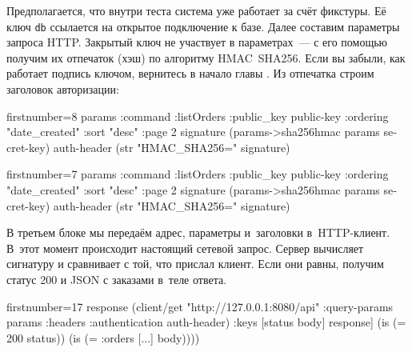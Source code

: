 \fi

\wavebottom

Предполагается, что внутри теста система уже работает за счёт фикстуры. Её ключ
\verb|db| ссылается на открытое подключение к базе. Далее составим параметры
запроса HTTP. Закрытый ключ не участвует в параметрах~--- с его помощью получим
их отпечаток (хэш) по алгоритму HMAC~SHA256. Если вы забыли, как работает
подпись ключом, вернитесь в начало главы . Из отпечатка строим
заголовок авторизации:

\wavetop

\ifx\devicetype\mobile

\begin{english}
  \begin{clojure/lines*}{firstnumber=8}
    params {:command :listOrders
            :public_key public-key
            :ordering "date_created"
            :sort "desc"
            :page 2}
    signature (params->sha256hmac
                params secret-key)
    auth-header (str "HMAC_SHA256="
                  signature)
  \end{clojure/lines*}
\end{english}

\else

\begin{english}
  \begin{clojure/lines*}{firstnumber=7}
        params {:command :listOrders
                :public_key public-key
                :ordering "date_created"
                :sort "desc"
                :page 2}
        signature (params->sha256hmac params secret-key)
        auth-header (str "HMAC_SHA256=" signature)
  \end{clojure/lines*}
\end{english}

\fi

\wavebottom

В третьем блоке мы передаём адрес, параметры и~заголовки в~HTTP-клиент. В~этот
момент происходит настоящий сетевой запрос. Сервер вычисляет сигнатуру и
сравнивает с той, что прислал клиент. Если они равны, получим статус 200 и JSON
с заказами в~теле ответа.

\wavetop

\ifx\devicetype\mobile

\begin{english}
  \begin{clojure/lines*}{firstnumber=17}
    response
    (client/get
      "http://127.0.0.1:8080/api"
      {:query-params params
       :headers {:authentication
                 auth-header}})
    {:keys [status body]} response]
(is (= 200 status))
(is (= {:orders [...]} body))))
  \end{clojure/lines*}
\end{english}

